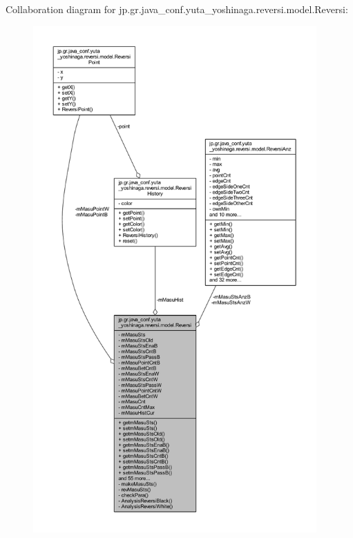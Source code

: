 Collaboration diagram for jp.\+gr.\+java\+\_\+conf.\+yuta\+\_\+yoshinaga.\+reversi.\+model.\+Reversi\+:\nopagebreak
\begin{figure}[H]
\begin{center}
\leavevmode
\includegraphics[height=550pt]{classjp_1_1gr_1_1java__conf_1_1yuta__yoshinaga_1_1reversi_1_1model_1_1_reversi__coll__graph}
\end{center}
\end{figure}
